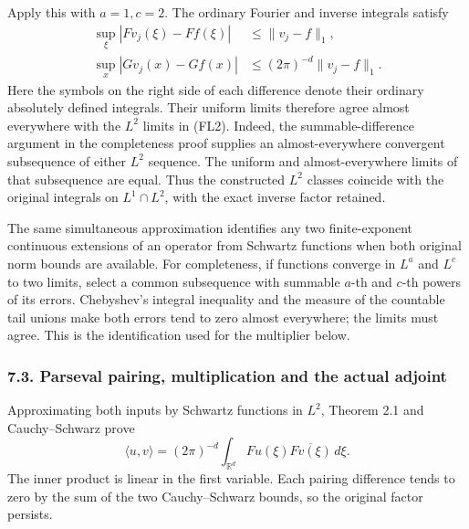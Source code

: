 \documentclass[
  11pt,
]{article}
\begin{document}
Apply this with \(a=1,c=2\). The ordinary Fourier and inverse integrals
satisfy \[
 \begin{split}
 \sup_\xi|Fv_j(\xi)-Ff(\xi)|&\leq\|v_j-f\|_1,\\
 \sup_x|Gv_j(x)-Gf(x)|&\leq(2\pi)^{-d}\|v_j-f\|_1 .
 \end{split}                                                   \tag{FL4}
\] Here the symbols on the right side of each difference denote their
ordinary absolutely defined integrals. Their uniform limits therefore
agree almost everywhere with the \(L^2\) limits in (FL2). Indeed, the
summable-difference argument in the completeness proof supplies an
almost-everywhere convergent subsequence of either \(L^2\) sequence. The
uniform and almost-everywhere limits of that subsequence are equal. Thus
the constructed \(L^2\) classes coincide with the original integrals on
\(L^1\cap L^2\), with the exact inverse factor retained.

The same simultaneous approximation identifies any two finite-exponent
continuous extensions of an operator from Schwartz functions when both
original norm bounds are available. For completeness, if functions
converge in \(L^a\) and \(L^c\) to two limits, select a common
subsequence with summable \(a\)-th and \(c\)-th powers of its errors.
Chebyshev's integral inequality and the measure of the countable tail
unions make both errors tend to zero almost everywhere; the limits must
agree. This is the identification used for the multiplier below.

\subsubsection{7.3. Parseval pairing, multiplication and the actual
adjoint}\label{parseval-pairing-multiplication-and-the-actual-adjoint}

Approximating both inputs by Schwartz functions in \(L^2\), Theorem 2.1
and Cauchy--Schwarz prove \[
 \langle u,v\rangle
   =(2\pi)^{-d}\int_{\mathbb R^d}
                     Fu(\xi)\overline{Fv(\xi)}\,d\xi .
                                                               \tag{FL5}
\] The inner product is linear in the first variable. Each pairing
difference tends to zero by the sum of the two Cauchy--Schwarz bounds,
so the original factor persists.
\end{document}
